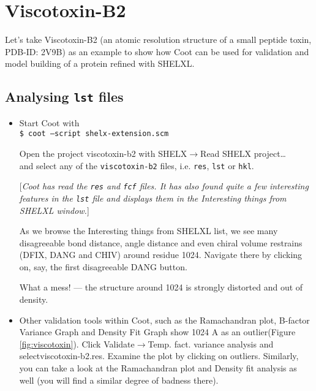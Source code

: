 \documentclass{article}
\begin{document}


\section{Viscotoxin-B2}
Let's take Viscotoxin-B2 (an atomic resolution structure of a small
peptide toxin, PDB-ID: 2V9B) as an example to show how Coot can be
used for validation and model building of a protein refined with
SHELXL.

\subsection{Analysing \texttt{lst} files}

\begin{itemize}
\item Start Coot with\\\texttt{\$ coot --script shelx-extension.scm}

  Open the project viscotoxin-b2 with \textsf{SHELX$\to$Read SHELX
    project\ldots}\\and select any of the \texttt{viscotoxin-b2}
  files, i.e. \texttt{res}, \texttt{lst} or \texttt{hkl}.

[\textsl{Coot has read the \texttt{res} and \texttt{fcf} files. It has
  also found quite a few interesting features in the \texttt{lst} file
  and displays them in the \textsf{Interesting things from SHELXL}
  window.}]

As we browse the Interesting things from SHELXL list, we see many
disagreeable bond distance, angle distance and even chiral volume
restrains (DFIX, DANG and CHIV) around residue 1024. Navigate there by
clicking on, say, the first disagreeable DANG button.

What a mess! --- the structure around 1024 is strongly distorted and
out of density.

\item Other validation tools within Coot, such as the Ramachandran
  plot, B-factor Variance Graph and Density Fit Graph show 1024 A as
  an outlier\linebreak[4](Figure \ref{fig:viscotoxin}). Click
  \textsf{Validate$\to$Temp. fact. variance analysis} and
  select\linebreak[4]\textsf{viscotoxin-b2.res}. Examine the plot by
  clicking on outliers. Similarly, you can take a look at the
  Ramachandran plot and Density fit analysis as well (you will find a
  similar degree of badness there).


\end{itemize}
\end{document}
